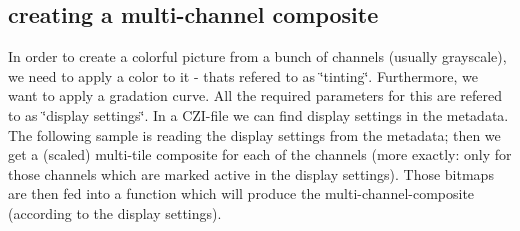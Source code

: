  \subsection*{creating a multi-\/channel composite}

In order to create a colorful picture from a bunch of channels (usually grayscale), we need to apply a color to it -\/ that\textquotesingle{}s refered to as \char`\"{}tinting\char`\"{}. Furthermore, we want to apply a gradation curve. All the required parameters for this are refered to as \char`\"{}display settings\char`\"{}. In a C\+Z\+I-\/file we can find display settings in the metadata. The following sample is reading the display settings from the metadata; then we get a (scaled) multi-\/tile composite for each of the channels (more exactly\+: only for those channels which are marked \textquotesingle{}active\textquotesingle{} in the display settings). Those bitmaps are then fed into a function which will produce the multi-\/channel-\/composite (according to the display settings).


